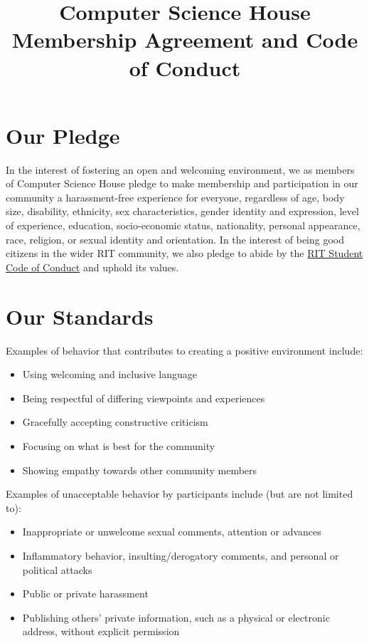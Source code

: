 \documentclass{article}
\title{
\textbf{Computer Science House}\\
Membership Agreement and Code of Conduct}
\author{}
\date{\datechanged}
\begin{document}
\maketitle

\section*{Our Pledge}

In the interest of fostering an open and welcoming environment, we as
members of Computer Science House pledge to make membership and
participation in our community a harassment-free experience for everyone,
regardless of age, body size, disability, ethnicity, sex characteristics,
gender identity and expression, level of experience, education,
socio-economic status, nationality, personal appearance, race, religion,
or sexual identity and orientation. In the interest of being good
citizens in the wider RIT community, we also pledge to abide by the
\href{https://www.rit.edu/studentaffairs/studentconduct/code-conduct}
{RIT Student Code of Conduct} and uphold its values.

\section*{Our Standards}

Examples of behavior that contributes to creating a positive environment
include:

\begin{itemize}
    \item Using welcoming and inclusive language
    \item Being respectful of differing viewpoints and experiences
    \item Gracefully accepting constructive criticism
    \item Focusing on what is best for the community
    \item Showing empathy towards other community members
\end{itemize}

\begin{flushleft}
Examples of unacceptable behavior by participants include (but are not
limited to):
\end{flushleft}

\begin{itemize}
    \item Inappropriate or unwelcome sexual comments, attention or advances
    \item Inflammatory behavior, insulting/derogatory comments, and personal
          or political attacks
    \item Public or private harassment
    \item Publishing others’ private information, such as a physical or
          electronic address, without explicit permission
\end{itemize}
\end{document}
